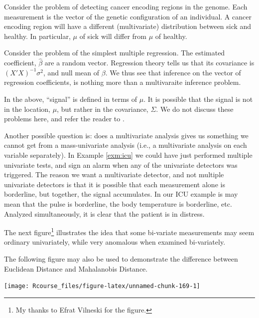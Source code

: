 \documentclass[]{book}
\theoremstyle{definition}
\theoremstyle{definition}
\theoremstyle{definition}
\theoremstyle{remark}
\let\BeginKnitrBlock\begin \let\EndKnitrBlock\end
\begin{document}
\BeginKnitrBlock{example}
\protect\hypertarget{exm:genetics}{}{\label{exm:genetics} }Consider the
problem of detecting cancer encoding regions in the genome. Each
measurement is the vector of the genetic configuration of an individual.
A cancer encoding region will have a different (multivariate)
distribution between sick and healthy. In particular, \(\mu\) of sick
will differ from \(\mu\) of healthy.
\EndKnitrBlock{example}

\BeginKnitrBlock{example}
\protect\hypertarget{exm:regression}{}{\label{exm:regression} }Consider the
problem of the simplest multiple regression. The estimated coefficient,
\(\hat \beta\) are a random vector. Regression theory tells us that its
covariance is \((X'X)^{-1}\sigma^2\), and null mean of \(\beta\). We
thus see that inference on the vector of regression coefficients, is
nothing more than a multivaraite inference problem.
\EndKnitrBlock{example}

\BeginKnitrBlock{remark}
{}In the above, ``signal'' is defined in terms
of \(\mu\). It is possible that the signal is not in the location,
\(\mu\), but rather in the covariance, \(\Sigma\). We do not discuss
these problems here, and refer the reader to \citet{nadler2008finite}.
\EndKnitrBlock{remark}

Another possible question is: does a multivariate analysis gives us
something we cannot get from a mass-univariate analysis (i.e., a
multivariate analysis on each variable separately). In Example
\ref{exm:icu} we could have just performed multiple univariate tests,
and sign an alarm when any of the univariate detectors was triggered.
The reason we want a multivariate detector, and not multiple univariate
detectors is that it is possible that each measurement alone is
borderline, but together, the signal accumulates. In our ICU example is
may mean that the pulse is borderline, the body temperature is
borderline, etc. Analyzed simultaneously, it is clear that the patient
is in distress.

The next figure\footnote{My thanks to Efrat Vilneski for the figure.}
illustrates the idea that some bi-variate measurements may seem ordinary
univariately, while very anomalous when examined bi-variately.

\BeginKnitrBlock{remark}
{}The following figure may also be used to
demonstrate the difference between Euclidean Distance and Mahalanobis
Distance.
\EndKnitrBlock{remark}

\texttt{[image: Rcourse\_files/figure-latex/unnamed-chunk-169-1]}
\end{document}

